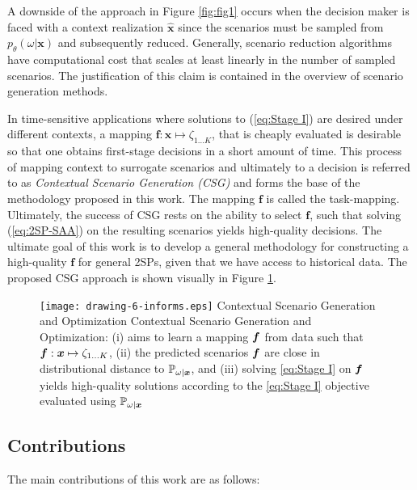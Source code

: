 A downside of the approach in Figure \ref{fig:fig1} occurs when the decision maker is faced with a context realization $\hat{\boldsymbol{x}}$ since the scenarios must be sampled from $p_{\theta}(\omega| \boldsymbol{x})$ and subsequently reduced. Generally, scenario reduction algorithms have computational cost that scales at least linearly in the number of sampled scenarios. The justification of this claim is contained in the overview of scenario generation methods.

In time-sensitive applications where solutions to (\ref{eq:Stage I}) are desired under different contexts, a mapping $\boldsymbol{f}: \boldsymbol{x} \mapsto \zeta_{1...K}$, that is cheaply evaluated is desirable so that one obtains first-stage decisions in a short amount of time. This process of mapping context to surrogate scenarios and ultimately to a decision is referred to as \textit{Contextual Scenario Generation (CSG)} and forms the base of the methodology proposed in this work. The mapping $\boldsymbol{f}$ is called the task-mapping. Ultimately, the success of CSG rests on the ability to select $\boldsymbol{f}$, such that solving (\ref{eq:2SP-SAA}) on the resulting scenarios yields high-quality decisions. The ultimate goal of this work is to develop a general methodology for constructing a high-quality $\boldsymbol{f}$ for general 2SPs, given that we have access to historical data. The proposed CSG approach is shown visually in Figure \ref{fig:fig2}. 

\begin{figure}
    \FIGURE
{\texttt{[image: drawing-6-informs.eps]}}
{Contextual Scenario Generation and Optimization \label{fig:fig2}}
{Contextual Scenario Generation and Optimization: (i) aims to learn a mapping $\boldsymbol{f}$ from data such that $\boldsymbol{f}: \boldsymbol{x} \mapsto \zeta_{1...K}$, (ii) the predicted scenarios  $\boldsymbol{f}$ are close in distributional distance to $\mathbb{P}_{\omega | \boldsymbol{x}}$, and (iii) solving \ref{eq:Stage I} on $\boldsymbol{f}$ yields high-quality solutions according to the \ref{eq:Stage I} objective evaluated using $\mathbb{P}_{\omega|\boldsymbol{x}}$ }
\end{figure}

\subsection*{Contributions}
The main contributions of this work are as follows:


